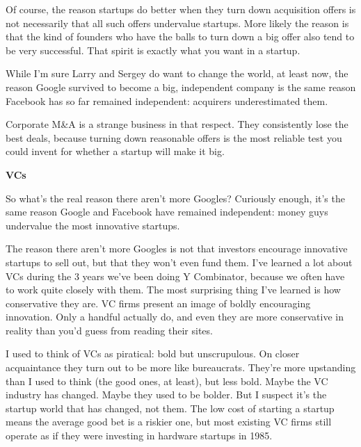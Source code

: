 Of course, the reason startups do
                  better when they turn down acquisition offers is not
                  necessarily that all such offers undervalue startups. More
                  likely the reason is that the kind of founders who have the
                  balls to turn down a big offer also tend to be very
                  successful. That spirit is exactly what you want in a
                  startup.

While I'm sure Larry and Sergey do want to
                  change the world, at least now, the reason Google survived to
                  become a big, independent company is the same reason Facebook
                  has so far remained independent: acquirers underestimated
                  them.

Corporate M\&A is a strange business in that
                  respect. They consistently lose the best deals, because
                  turning down reasonable offers is the most reliable test you
                  could invent for whether a startup will make it big.

\textbf{VCs}

So what's the real reason there aren't more
                  Googles? Curiously enough, it's the same reason Google and
                  Facebook have remained independent: money guys undervalue the
                  most innovative startups.

The reason there aren't
                  more Googles is not that investors encourage innovative
                  startups to sell out, but that they won't even fund them. I've
                  learned a lot about VCs during the 3 years we've been doing Y
                  Combinator, because we often have to work quite closely with
                  them. The most surprising thing I've learned is how
                  conservative they are. VC firms present an image of boldly
                  encouraging innovation. Only a handful actually do, and even
                  they are more conservative in reality than you'd guess from
                  reading their sites.

I used to think of VCs as
                  piratical: bold but unscrupulous. On closer acquaintance they
                  turn out to be more like bureaucrats. They're more upstanding
                  than I used to think (the good ones, at least), but less bold.
                  Maybe the VC industry has changed. Maybe they used to be
                  bolder. But I suspect it's the startup world that has changed,
                  not them. The low cost of starting a startup means the average
                  good bet is a riskier one, but most existing VC firms still
                  operate as if they were investing in hardware startups in
                  1985.

